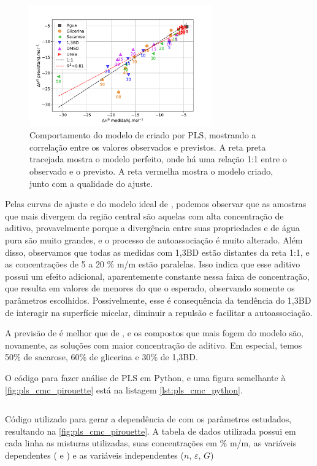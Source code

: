 		\begin{figure}[h]
			\centering
			\includegraphics[width=0.7\textwidth]{imagens/itc/PLS_dh_pirouette}
			\caption{Comportamento do modelo de \DHmic{} criado por PLS, mostrando a correlação entre os valores observados e previstos. A reta preta tracejada mostra o modelo perfeito, onde há uma relação 1:1 entre o observado e o previsto. A reta vermelha mostra o modelo criado, junto com a qualidade do ajuste.}
			\label{fig:pls_dh_pirouette}
		\end{figure} 
		
		Pelas curvas de ajuste e do modelo ideal de \cmc, podemos observar que as amostras que mais divergem da região central são aquelas com alta concentração de aditivo, provavelmente porque a divergência entre suas propriedades e de água pura são muito grandes, e o processo de autoassociação é muito alterado. Além disso, observamos que todas as medidas com 1,3BD estão distantes da reta 1:1, e as concentrações de 5 a 20 \% m/m estão paralelas. Isso indica que esse aditivo possui um efeito adicional, aparentemente constante nessa faixa de concentração, que resulta em valores de \cmc{} menores do que o esperado, observando somente os parâmetros escolhidos. Possivelmente, esse é consequência da tendência do 1,3BD de interagir na superfície micelar, diminuir a repulsão e facilitar a autoassociação.
		
		A previsão de \DHmic{} é melhor que de \cmc, e os compostos que mais fogem do modelo são, novamente, as soluções com maior concentração de aditivo. Em especial, temos 50\% de sacarose, 60\% de glicerina e 30\% de 1,3BD.
		
		O código para fazer análise de PLS em Python, e uma figura semelhante à \autoref{fig:pls_cmc_pirouette} está na listagem \ref{lst:pls_cmc_python}.
		
		\begin{listing}[h]
			\inputminted{python}{./python/pls_cmc_sklearn.py}
			\caption{Código utilizado para gerar a dependência de \cmc{} com os parâmetros estudados, resultando na \autoref{fig:pls_cmc_pirouette}. A tabela de dados utilizada possui em cada linha as misturas utilizadas, suas concentrações em \% m/m, as variáveis dependentes (\cmc{} e \DHmic) e as variáveis independentes (\(n\), \(\varepsilon\), \(G\))}
			\label{lst:pls_cmc_python}
		\end{listing}
		
